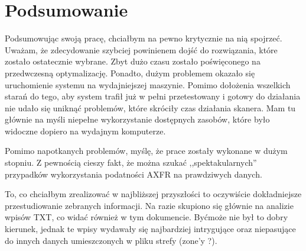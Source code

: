 \section{Podsumowanie}

Podsumowując swoją pracę, chciałbym na pewno krytycznie na nią spojrzeć. Uważam, że zdecydowanie szybciej powinienem dojść do rozwiązania, które zostało ostatecznie wybrane. Zbyt dużo czasu zostało poświęconego na przedwczesną optymalizację. Ponadto, dużym problemem okazało się uruchomienie systemu na wydajniejszej maszynie. Pomimo dołożenia wszelkich starań do tego, aby system trafił już w pełni przetestowany i gotowy do działania nie udało się uniknąć problemów, które skróciły czas działania skanera. Mam tu głównie na myśli niepełne wykorzystanie dostępnych zasobów, które było widoczne dopiero na wydajnym komputerze.

Pomimo napotkanych problemów, myślę, że prace zostały wykonane w dużym stopniu. Z pewnością cieszy fakt, że można szukać ,,spektakularnych'' przypadków wykorzystania podatności AXFR na prawdziwych danych. 

To, co chciałbym zrealizować w najbliższej przyszłości to oczywiście dokładniejsze przestudiowanie zebranych informacji. Na razie skupiono się głównie na analizie wpisów TXT, co widać również w tym dokumencie. Byćmoże nie był to dobry kierunek, jednak te wpisy wydawały się najbardziej intrygujące oraz niepasujące do innych danych umieszczonych w pliku strefy (zone'y ?).
